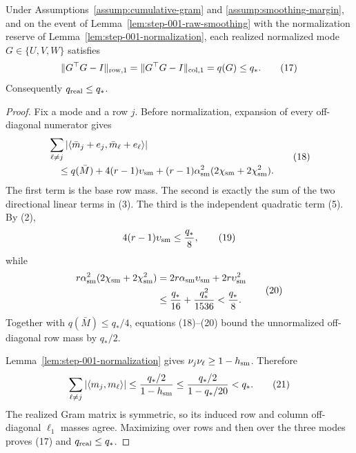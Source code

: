 \begin{proposition}\label{prop:step-001-realized-gram}
Under Assumptions~\ref{assump:cumulative-gram} and
\ref{assump:smoothing-margin}, and on the event of
Lemma~\ref{lem:step-001-raw-smoothing} with the normalization reserve
of Lemma~\ref{lem:step-001-normalization}, each realized normalized
mode $G\in\{U,V,W\}$ satisfies
\[
\|G^\top G-I\|_{\rm row,1}
=\|G^\top G-I\|_{\rm col,1}
=q(G)\le q_*.
\tag{17}
\]
Consequently $q_{\rm real}\le q_*$.

\begin{proof}
Fix a mode and a row $j$. Before normalization, expansion of every
off-diagonal numerator gives
\[
\begin{aligned}
&\sum_{\ell\ne j}
|\langle\bar m_j+e_j,\bar m_\ell+e_\ell\rangle|\\
&\quad\le q(\bar M)+4(r-1)\upsilon_{\rm sm}
 +(r-1)\alpha_{\rm sm}^2
 (2\chi_{\rm sm}+2\chi_{\rm sm}^2).
\end{aligned}
\tag{18}
\]
The first term is the base row mass. The second is exactly the sum of the
two directional linear terms in (3). The third is the independent quadratic
term (5). By (2),
\[
4(r-1)\upsilon_{\rm sm}\le {q_*\over8},
\tag{19}
\]
while
\[
\begin{aligned}
r\alpha_{\rm sm}^2
(2\chi_{\rm sm}+2\chi_{\rm sm}^2)
&=2r\alpha_{\rm sm}\upsilon_{\rm sm}
  +2r\upsilon_{\rm sm}^2\\
&\le {q_*\over16}+{q_*^2\over1536}
<{q_*\over8}.
\end{aligned}
\tag{20}
\]
Together with $q(\bar M)\le q_*/4$, equations (18)--(20) bound the
unnormalized off-diagonal row mass by $q_*/2$.

Lemma~\ref{lem:step-001-normalization} gives
$\nu_j\nu_\ell\ge1-h_{\rm sm}$. Therefore
\[
\sum_{\ell\ne j}|\langle m_j,m_\ell\rangle|
\le {q_*/2\over1-h_{\rm sm}}
\le {q_*/2\over1-q_*/20}<q_*.
\tag{21}
\]
The realized Gram matrix is symmetric, so its induced row and column
off-diagonal $\ell_1$ masses agree. Maximizing over rows and then over the
three modes proves (17) and $q_{\rm real}\le q_*$. 


\end{proof}
\end{proposition}
